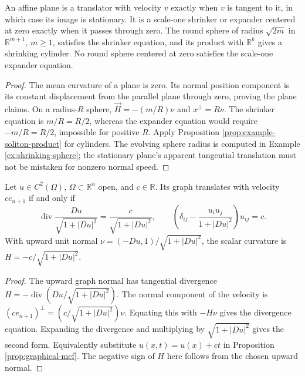 \begin{example}\label{ex:soliton-model-comparison}
An affine plane is a translator with velocity $v$ exactly when $v$ is tangent to it, in which case its image is stationary. It is a scale-one shrinker or expander centered at zero exactly when it passes through zero. The round sphere of radius $\sqrt{2m}$ in $\mathbb R^{m+1}$, $m\geq1$, satisfies the shrinker equation, and its product with $\mathbb R^k$ gives a shrinking cylinder. No round sphere centered at zero satisfies the scale-one expander equation.
\end{example}
\begin{proof}
The mean curvature of a plane is zero. Its normal position component is its constant displacement from the parallel plane through zero, proving the plane claims. On a radius-$R$ sphere, $\vec H=-(m/R)\nu$ and $x^\perp=R\nu$. The shrinker equation is $m/R=R/2$, whereas the expander equation would require $-m/R=R/2$, impossible for positive $R$. Apply Proposition \ref{prop:example-soliton-product} for cylinders. The evolving sphere radius is computed in Example \ref{ex:shrinking-sphere}; the stationary plane's apparent tangential translation must not be mistaken for nonzero normal speed.
\end{proof}

\begin{proposition}\label{prop:translator-graph-example}
Let $u\in C^2(\Omega)$, $\Omega\subset\mathbb R^n$ open, and $c\in\mathbb R$. Its graph translates with velocity $ce_{n+1}$ if and only if
\[
 \operatorname{div}\frac{Du}{\sqrt{1+|Du|^2}}
 =\frac{c}{\sqrt{1+|Du|^2}},
 \qquad
 \left(\delta_{ij}-\frac{u_i u_j}{1+|Du|^2}\right)u_{ij}=c.
\]
With upward unit normal $\nu=(-Du,1)/\sqrt{1+|Du|^2}$, the scalar curvature is $H=-c/\sqrt{1+|Du|^2}$.
\end{proposition}
\begin{proof}
The upward graph normal has tangential divergence $H=-\operatorname{div}(Du/\sqrt{1+|Du|^2})$. The normal component of the velocity is $(ce_{n+1})^\perp=(c/\sqrt{1+|Du|^2})\nu$. Equating this with $-H\nu$ gives the divergence equation. Expanding the divergence and multiplying by $\sqrt{1+|Du|^2}$ gives the second form. Equivalently substitute $u(x,t)=u(x)+ct$ in Proposition \ref{prop:graphical-mcf}. The negative sign of $H$ here follows from the chosen upward normal.
\end{proof}

